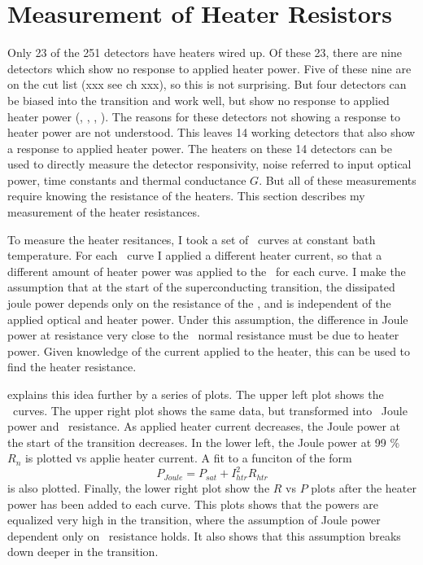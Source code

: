 \section{Measurement of Heater Resistors}

Only 23 of the 251 detectors have heaters wired up.
Of these 23, there are nine detectors which show no response to applied heater power.
Five of these nine are on the cut list (xxx see ch xxx), so this is not surprising.
But four detectors can be biased into the transition and work well, but show no response to applied heater power (, , , ).
The reasons for these detectors not showing a response to heater power are not understood.
This leaves 14 working detectors that also show a response to applied heater power.
The heaters on these 14 detectors can be used to directly measure the detector responsivity, noise referred to input optical power, time constants and thermal conductance $G$.
But all of these measurements require knowing the resistance of the heaters.
This section describes my measurement of the heater resistances.

To measure the heater resitances, I took a set of \IV\ curves at constant bath temperature.
For each \IV\ curve I applied a different heater current, so that a different amount of heater power was applied to the \TES\ for each curve.
I make the assumption that at the start of the superconducting transition, the dissipated joule power depends only on the resistance of the \TES, and is independent of the applied optical and heater power.
Under this assumption, the difference in Joule power at resistance very close to the \TES\ normal resistance must be due to heater power.
Given knowledge of the current applied to the heater, this can be used to find the heater resistance.

 explains this idea further by a series of plots.
The upper left plot shows the \TES\ \IV curves.
The upper right plot shows the same data, but transformed into \TES\ Joule power and \TES\ resistance.
As applied heater current decreases, the Joule power at the start of the transition decreases.
In the lower left, the Joule power at 99 \% $R_{n}$ is plotted vs applie heater current.
A fit to a funciton of the form
\[
P_{Joule} = P_{sat} + I_{htr}^2 R_{htr}
\]
is also plotted.
Finally, the lower right plot show the $R$ vs $P$ plots after the heater power has been added to each curve.
This plots shows that the powers are equalized very high in the transition, where the assumption of Joule power dependent only on \TES\ resistance holds.
It also shows that this assumption breaks down deeper in the transition.

